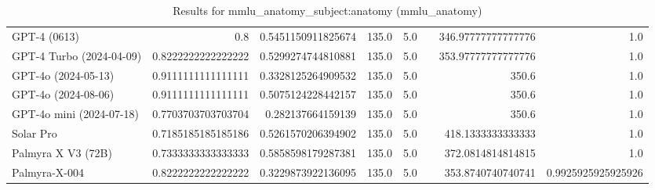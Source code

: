 \begin{table}[htp]
{\begin{tabular}{lrrrrrrr}
GPT-4 (0613) & 0.8 & 0.5451150911825674 & 135.0 & 5.0 &  & 346.97777777777776 & 1.0 \\
GPT-4 Turbo (2024-04-09) & 0.8222222222222222 & 0.5299274744810881 & 135.0 & 5.0 &  & 353.97777777777776 & 1.0 \\
GPT-4o (2024-05-13) & 0.9111111111111111 & 0.3328125264909532 & 135.0 & 5.0 &  & 350.6 & 1.0 \\
GPT-4o (2024-08-06) & 0.9111111111111111 & 0.5075124228442157 & 135.0 & 5.0 &  & 350.6 & 1.0 \\
GPT-4o mini (2024-07-18) & 0.7703703703703704 & 0.282137664159139 & 135.0 & 5.0 &  & 350.6 & 1.0 \\
Solar Pro & 0.7185185185185186 & 0.5261570206394902 & 135.0 & 5.0 &  & 418.1333333333333 & 1.0 \\
Palmyra X V3 (72B) & 0.7333333333333333 & 0.5858598179287381 & 135.0 & 5.0 &  & 372.0814814814815 & 1.0 \\
Palmyra-X-004 & 0.8222222222222222 & 0.3229873922136095 & 135.0 & 5.0 &  & 353.8740740740741 & 0.9925925925925926 \\
\bottomrule
\end{tabular}}
\caption{Results for mmlu_anatomy_subject:anatomy (mmlu_anatomy)}
\label{fig:mmlu_anatomy_subject:anatomy (mmlu_anatomy)}
\end{table}